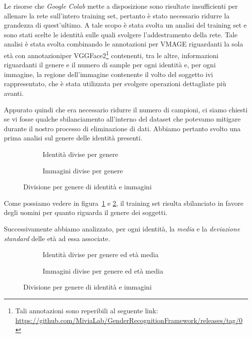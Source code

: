 Le risorse che \textit{Google Colab} mette a disposizione sono risultate insufficienti per allenare la rete sull'intero training set, pertanto è stato necessario ridurre la grandezza di quest'ultimo. A tale scopo è stata svolta un analisi del training set e sono stati scelte le identità sulle quali svolgere l'addestramento della rete. Tale analisi è stata svolta combinando le annotazioni per VMAGE riguardanti la sola età con annotazioniper VGGFace2\footnote{Tali annotazioni sono reperibili al seguente link: \url{https://github.com/MiviaLab/GenderRecognitionFramework/releases/tag/0}} contenenti, tra le altre, informazioni riguardanti il genere e il numero di sample per ogni identità e, per ogni immagine, la regione dell'immagine contenente il volto del soggetto ivi rappresentato, che è stata utilizzata per svolgere operazioni dettagliate più avanti.

Appurato quindi che era necessario ridurre il numero di campioni, ci siamo chiesti se vi fosse qualche sbilanciamento all'interno del dataset che potevamo mitigare durante il nostro processo di eliminazione di dati. Abbiamo pertanto svolto una prima analisi sul genere delle identità presenti.

\begin{figure}[ht]

\begin{subfigure}{0.5\textwidth}
\def\svgscale{0.5}

\caption{Identità divise per genere}
\label{sfig:Ids per gender}
\end{subfigure}
\begin{subfigure}{0.5\textwidth}
\def\svgscale{0.5}

\caption{Immagini divise per genere}
\label{sfig:Images per gender}
\end{subfigure}
\caption{Divisione per genere di identità e immagini}
\label{fig:gender_division}
\end{figure}

Come possiamo vedere in figura~\ref{sfig:Ids per gender} e \ref{sfig:Images per gender}, il training set risulta sbilanciato in favore degli uomini per quanto riguarda il genere dei soggetti.

Successivamente abbiamo analizzato, per ogni identità, la \emph{media} e la \emph{deviazione standard} delle età ad essa associate.

\begin{figure}[ht]

\begin{subfigure}{0.5\textwidth}
\def\svgscale{0.42}

\caption{Identità divise per genere ed età media}
\label{sfig:Ids per gender and mean age}
\end{subfigure}
\begin{subfigure}{0.5\textwidth}
\def\svgscale{0.42}

\caption{Immagini divise per genere ed età media}
\label{sfig:Images per gender and mean age}
\end{subfigure}
\caption{Divisione per genere di identità e immagini}
\label{fig:gender_age_division}
\end{figure}

